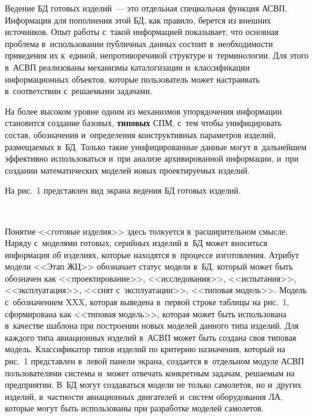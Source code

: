 \begin{multicols}{2}

  Ведение БД  готовых изделий~--- это отдельная\linebreak 
специальная функция \mbox{АСВП}. Информация для пополнения этой БД, как 
правило, берется из внеш\-них источников. Опыт работы с~такой информацией 
показывает, что основная проб\-ле\-ма в~\mbox{использовании} публичных данных 
состоит в~не\-об\-хо\-ди\-мости приведения их к~единой, непротиворечивой структуре и~терминологии. 
Для этого в~\mbox{АСВП} реализованы механизмы каталогизации 
и~классификации информационных объектов, которые пользователь может 
на\-стра\-и\-вать в~соответствии с~ре\-ша\-емы\-ми задачами. 

На более высоком уровне 
одним из механизмов упорядочения информации становится создание базовых, 
\textbf{типовых} СПМ, с~тем чтобы унифицировать со\-став, обозначения 
и~определения \mbox{конструктивных} па\-ра\-мет\-ров изделий, раз\-ме\-ща\-емых в~БД. 
Только такие унифицированные данные могут в~дальнейшем эффективно 
использоваться и~при анализе архивированной информации, и~при создании 
математических моделей новых про\-ек\-ти\-ру\-емых изделий.
  
  На рис.~1 представлен вид экрана ведения БД готовых изделий.
  
  \begin{figure*} %
\vspace*{1pt}
      \begin{center}
     \mbox{%
\epsfxsize=100.912mm 
}
\end{center}
\vspace*{-9pt}
\end{figure*}

    Понятие <<готовые изделия>> здесь толкуется в~расширительном смыс\-ле. 
Наряду с~моделями готовых, серийных изделий в~БД может вноситься 
информация об изделиях, которые находятся в~процессе изготовления. Атрибут 
модели <<Этап ЖЦ>> обозначает статус модели в~БД, который может быть 
обозначен как <<проектирование>>, <<исследования>>, <<испытания>>, 
<<эксплуатация>>, <<снят с~эксплуатации>>, <<типовая модель>>. Модель 
с~обозначением XXX, которая выведена в~первой строке таб\-ли\-цы на рис.~1, 
сформирована как <<типовая модель>>, которая может быть использована 
в~качестве шаблона при по\-стро\-ении новых моделей данного типа изделий. Для 
каждого типа авиационных изделий в~\mbox{АСВП} может быть создана своя типовая 
модель. 
%
Классификатор типов изделий по критерию назначения, который на 
рис.~1 представлен в~левой панели экрана, создается в~отдельном модуле 
\mbox{АСВП} пользователями сис\-те\-мы и~может отвечать конкретным задачам, 
решаемым на предприятии. В~БД могут создаваться модели не только 
самолетов, но и~других изделий, в~част\-ности авиационных двигателей 
и~сис\-тем оборудования ЛА, которые могут быть использованы при 
разработке моделей самолетов.


\end{multicols}
